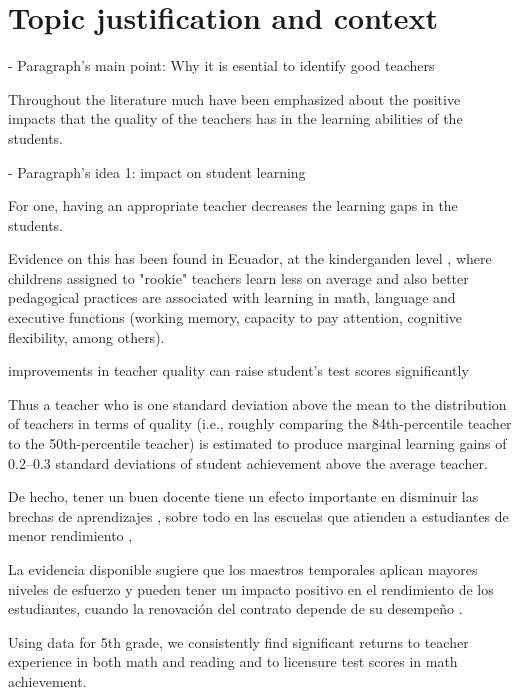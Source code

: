 \section{Topic justification and context}

- Paragraph's main point: Why it is esential to identify good teachers

Throughout the literature much have been emphasized about the positive impacts that the quality of the teachers has in the learning abilities of the students.

- Paragraph's idea 1: impact on student learning
  
For one, having an appropriate teacher decreases the learning gaps in the students.

Evidence on this has been found in Ecuador, at the kinderganden level \citep{Araujo_et_al_2016}, where childrens assigned to "rookie" teachers learn less on average and also better pedagogical practices are associated with learning in math, language and executive functions (working memory, capacity to pay attention, cognitive flexibility, among others).

improvements in teacher quality can raise student's test scores significantly \citep{Chetty_et_al_2014a}


Thus a teacher who is one standard deviation above the mean to the distribution of teachers in terms of quality (i.e., roughly comparing the 84th-percentile teacher to the 50th-percentile teacher) is estimated to produce marginal learning gains of 0.2–0.3 standard deviations of student achievement above the average teacher. \citep{Hanushek_et_al_2012}


De hecho, tener un buen docente tiene un efecto importante en disminuir las brechas de aprendizajes \cite{Araujo_et_al_2016; Chetty_et_al_2014a; Hanushek_et_al_2012; Rockoff_2004}, sobre todo en las escuelas que atienden a estudiantes de menor rendimiento \citep{Rivkin_et_al_2005},


La evidencia disponible sugiere que los maestros temporales aplican mayores niveles de esfuerzo y pueden tener un impacto positivo en el rendimiento de los estudiantes, cuando la renovación del contrato depende de su desempeño \citep{Duflo_et_al_2009; Muralidharan_et_al_2013}.


Using data for 5th grade, we consistently find significant returns to teacher experience in both math and reading and to licensure test scores in math achievement. \citep{Hanushek_et_al_2012}


